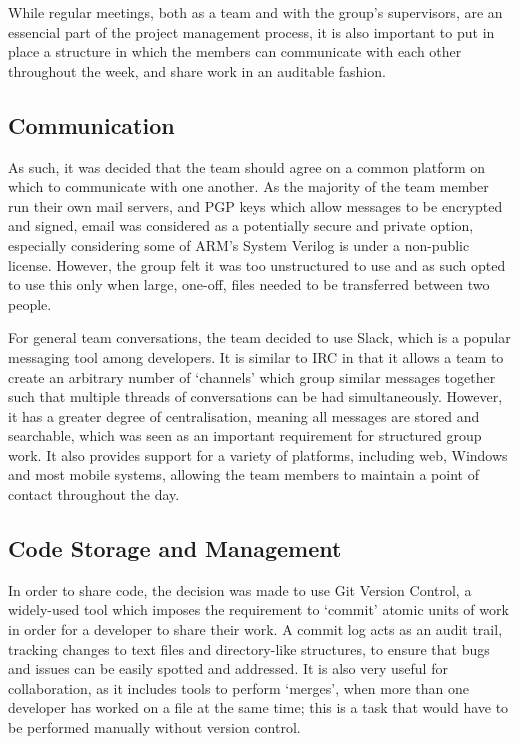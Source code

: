 
While regular meetings, both as a team and with the group's supervisors, are an essencial part of the project management process, it is also important to put in place a structure in which the members can communicate with each other throughout the week, and share work in an auditable fashion.

\subsection{Communication}
As such, it was decided that the team should agree on a common platform on which to communicate with one another. As the majority of the team member run their own mail servers, and PGP keys which allow messages to be encrypted and signed, email was considered as a potentially secure and private option, especially considering some of ARM's System Verilog is under a non-public license. However, the group felt it was too unstructured to use and as such opted to use this only when large, one-off, files needed to be transferred between two people.

For general team conversations, the team decided to use Slack, which is a popular messaging tool among developers. It is similar to IRC in that it allows a team to create an arbitrary number of `channels' which group similar messages together such that multiple threads of conversations can be had simultaneously. However, it has a greater degree of centralisation, meaning all messages are stored and searchable, which was seen as an important requirement for structured group work. It also provides support for a variety of platforms, including web, Windows and most mobile systems, allowing the team members to maintain a point of contact throughout the day.

\subsection{Code Storage and Management}
In order to share code, the decision was made to use Git Version Control, a widely-used tool which imposes the requirement to `commit' atomic units of work in order for a developer to share their work. A commit log acts as an audit trail, tracking changes to text files and directory-like structures, to ensure that bugs and issues can be easily spotted and addressed. It is also very useful for collaboration, as it includes tools to perform `merges', when more than one developer has worked on a file at the same time; this is a task that would have to be performed manually without version control.

